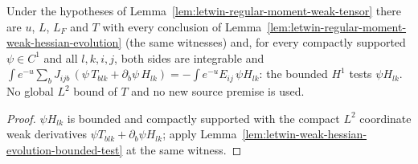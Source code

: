\begin{lemma}
  \label{lem:letwin-regular-moment-bounded-hessian-testing}
  \leanok
  Under the hypotheses of Lemma~\ref{lem:letwin-regular-moment-weak-tensor} there are $u$, $L$, $L_F$ and $T$ with every conclusion of
  Lemma~\ref{lem:letwin-regular-moment-weak-hessian-evolution} (the same witnesses) and, for every compactly supported $\psi\in C^1$ and
  all $l,k,i,j$, both sides are integrable and
  $\int e^{-u}\sum_bJ_{ijb}\,(\psi\,T_{blk}+\partial_b\psi\,H_{lk})=-\int e^{-u}E_{ij}\,\psi H_{lk}$: the bounded $H^1$ tests
  $\psi H_{lk}$. No global $L^2$ bound of $T$ and no new source premise is used.
\end{lemma}
\begin{proof}
  \leanok
  $\psi H_{lk}$ is bounded and compactly supported with the compact $L^2$ coordinate weak derivatives $\psi T_{blk}+\partial_b\psi H_{lk}$;
  apply Lemma~\ref{lem:letwin-weak-hessian-evolution-bounded-test} at the same witness.
\end{proof}

